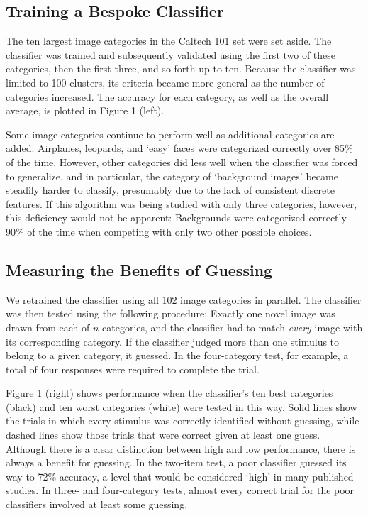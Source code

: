 \documentclass{frontiersSCNS} %
\begin{document}
\subsection{Training a Bespoke Classifier}

The ten largest image categories in the Caltech 101 set were set aside. The classifier was trained and subsequently validated using the first two of these categories, then the first three, and so forth up to ten. Because the classifier was limited to 100 clusters, its criteria became more general as the number of categories increased. The accuracy for each category, as well as the overall average, is plotted in Figure 1 (left).

Some image categories continue to perform well as additional categories are added: Airplanes, leopards, and `easy' faces were categorized correctly over 85\% of the time. However, other categories did less well when the classifier was forced to generalize, and in particular, the category of `background images' became steadily harder to classify, presumably due to the lack of consistent discrete features. If this algorithm was being studied with only three categories, however, this deficiency would not be apparent: Backgrounds were categorized correctly 90\% of the time when competing with only two other possible choices.

\subsection{Measuring the Benefits of Guessing}

We retrained the classifier using all 102 image categories in parallel. The classifier was then tested using the following procedure: Exactly one novel image was drawn from each of $n$ categories, and the classifier had to match \textsl{every} image with its corresponding category. If the classifier judged more than one stimulus to belong to a given category, it guessed. In the four-category test, for example, a total of four responses were required to complete the trial.

Figure 1 (right) shows performance when the classifier's ten best categories (black) and ten worst categories (white) were tested in this way. Solid lines show the trials in which every stimulus was correctly identified without guessing, while dashed lines show those trials that were correct given at least one guess. Although there is a clear distinction between high and low performance, there is always a benefit for guessing. In the two-item test, a poor classifier guessed its way to 72\% accuracy, a level that would be considered `high' in many published studies. In three- and four-category tests, almost every correct trial for the poor classifiers involved at least some guessing.
\end{document}
